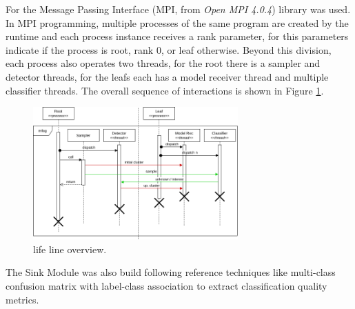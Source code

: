 For \mfog the Message Passing Interface (MPI, from \emph{Open MPI 4.0.4}) library was used.
In MPI programming, multiple processes of the same program are created by the
runtime and each process instance receives a rank parameter, for \mfog this
parameters indicate if the process is root, rank $0$, or leaf otherwise.
Beyond this division, each process also operates two threads, for the root
there is a sampler and detector threads, for the leafs each has a model receiver
thread and multiple classifier threads.
The overall sequence of interactions is shown in Figure \ref{fig:mfog-mpi-life}.

\begin{figure}[htb]
  \centerline{\includegraphics[width=0.7\textwidth]{figures/mfog-arch-mpi.png}}
  \caption{\mfog life line overview.}
  \label{fig:mfog-mpi-life}
\end{figure}

The Sink Module was also build following reference techniques like
multi-class confusion matrix with label-class association
\cite{Faria2016minas}
to extract classification quality metrics.
